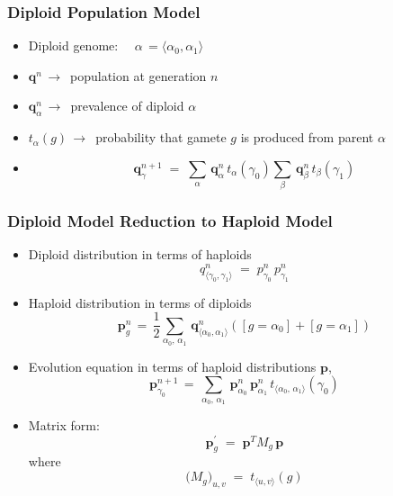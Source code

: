 \documentclass[aspectratio=169]{beamer}
\begin{document}
  \begin{frame}
    \frametitle{Diploid Population Model}
    \begin{itemize}
      \item{Diploid genome: $\quad \alpha \,= \langle \alpha_0, \alpha_1 \rangle$}
      \item{$\bm{q}^n \, \to \,$ population at generation $n$} 
      \item{$\bm{q}_\alpha^n \, \to \,$ prevalence of diploid $\alpha$}
      \item{$t_\alpha(g) \, \to\,$ probability that gamete $g$ is produced from parent $\alpha$ }
      \item{\[\bm{q}_\gamma^{n+1} \; = \;
      \sum_{\alpha} \, \bm{q}_\alpha^n \, t_\alpha(\gamma_0) 
      \sum_{\beta} \,\bm{q}_\beta^n \, t_\beta(\gamma_1)\]}
    \end{itemize}
  \end{frame}
  
  \begin{frame}
    \frametitle{Diploid Model Reduction to Haploid Model}
    \begin{itemize}
      \item{Diploid distribution in terms of haploids
      \[q_{\langle \gamma_0, \gamma_1 \rangle}^{n} \; = \;
      p_{\gamma_0}^{n} \, p_{\gamma_1}^{n}\]}
      \item{Haploid distribution in terms of diploids
      \[ \bm{p}_g^n \, = \, \frac{1}{2} \sum_{\alpha_0, \, \alpha_1} \, \bm{q}_{\langle \alpha_0, \alpha_1 \rangle}^n
	    ([g = \alpha_0] + [g = \alpha_1]) \]}
      \item{Evolution equation in terms of haploid distributions $\bm{p}$,
      \[\bm{p}_{\gamma_0}^{n+1} \,=\, \sum_{\alpha_0, \, \alpha_1} \, \bm{p}_{\alpha_0}^n \, \bm{p}_{\alpha_1}^n \,
	  t_{\langle \alpha_0, \,\alpha_1 \rangle}(\gamma_0) \]}
      \item{Matrix form:
      \[ \bm{p}_g^\prime \; = \; \bm{p}^T M_g \, \bm{p} \] where \[ \Big(M_g \Big)_{u,v} \; = \; t_{\langle u, v \rangle}(g) \]}
    \end{itemize}
  \end{frame}
  
\end{document}
